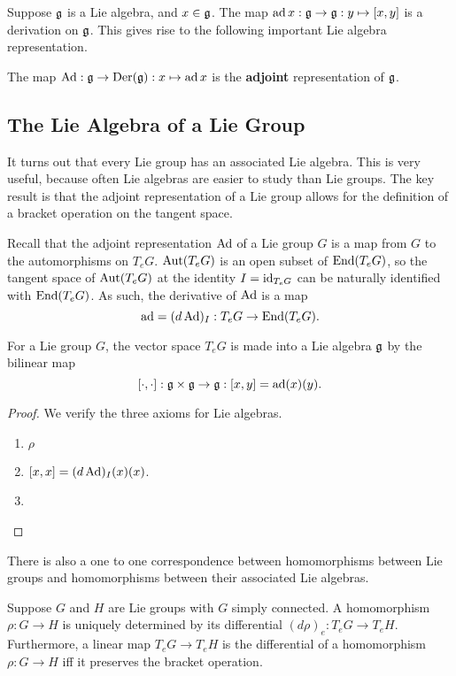 \documentclass[a4paper]{article}
\begin{document}
Suppose $\mathfrak{g}$ is a Lie algebra, and $x \in \mathfrak{g}$. The map $\operatorname{ad} x : \mathfrak{g} \to \mathfrak{g}: y \mapsto \left[ x, y \right]$ is a derivation on $\mathfrak{g}$. This gives rise to the following important Lie algebra representation.

\begin{defi}
    The map $\operatorname{Ad} : \mathfrak{g} \to \operatorname{Der}(\mathfrak{g}) : x \mapsto \operatorname{ad} x$ is the \textbf{adjoint} representation of $\mathfrak{g}$.
\end{defi}

\subsection{The Lie Algebra of a Lie Group}
It turns out that every Lie group has an associated Lie algebra. This is very useful, because often Lie algebras are easier to study than Lie groups. The key result is that the adjoint representation of a Lie group allows for the definition of a bracket operation on the tangent space.

Recall that the adjoint representation $\operatorname{Ad}$ of a Lie group $G$ is a map from $G$ to the automorphisms on $T_e G$. $\operatorname{Aut}(T_e G)$ is an open subset of $\operatorname{End}(T_e G)$, so the tangent space of $\operatorname{Aut}(T_e G)$ at the identity $I = \operatorname{id}_{T_e G}$ can be naturally identified with $\operatorname{End}(T_e G)$. As such, the derivative of $\operatorname{Ad}$ is a map
$$\operatorname{ad} = (d\operatorname{Ad})_{I}: T_e G \to \operatorname{End}(T_e G).$$

\begin{thm}
    For a Lie group $G$, the vector space $T_e G$ is made into a Lie algebra $\mathfrak{g}$ by the bilinear map
    $$\left[ \cdot, \cdot \right] : \mathfrak{g} \times \mathfrak{g} \to \mathfrak{g} : \left[ x, y \right] = \operatorname{ad}(x)(y).$$
\end{thm}

\begin{proof} 
We verify the three axioms for Lie algebras.
\begin{enumerate}
    \item $\rho $ 
    \item $\left[ x, x \right] = (d\operatorname{Ad})_{I}(x)(x)$. 
    \item 
\end{enumerate}
\end{proof}

There is also a one to one correspondence between homomorphisms between Lie groups and homomorphisms between their associated Lie algebras.

\begin{thm}
    Suppose $G$ and $H$ are Lie groups with $G$ simply connected. A homomorphism $\rho: G \to H$ is uniquely determined by its differential $(d\rho)_e : T_e G \to T_e H$. Furthermore, a linear map $T_e G \to T_e H$ is the differential of a homomorphism $\rho: G \to H$ iff it preserves the bracket operation.
\end{thm}
\end{document}
